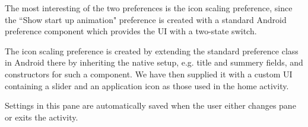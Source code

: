 The most interesting of the two preferences is the icon scaling preference, since the ``Show start up animation" preference is created with a standard Android preference component which provides the UI with a two-state switch.

The icon scaling preference is created by extending the standard preference class in Android there by inheriting the native setup, e.g. title and summery fields, and constructors for such a component. We have then supplied it with a custom UI containing a slider and an application icon as those used in the home activity.

Settings in this pane are automatically saved when the user either changes pane or exits the activity.
